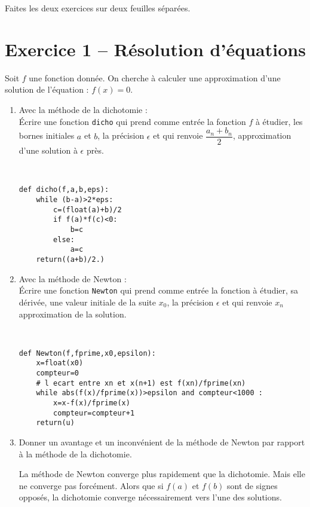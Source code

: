 





\begin{center}
{\Large\bf {\type} \no {\num}}
\end{center}


Faites les deux exercices sur deux feuilles séparées.

\section*{Exercice 1 --  Résolution d'équations}
Soit $f$ une fonction donnée. On cherche à calculer une approximation d'une solution de l'équation : $f(x)=0$.
\begin{enumerate}
\item Avec la méthode de la dichotomie : \\
Écrire une fonction \verb?dicho? qui prend comme entr\' ee la fonction $f$ \` a \' etudier, les bornes initiales $a$ et $b$, la pr\' ecision $\epsilon$ et qui renvoie $\dfrac{a_n+b_n}{2}$, approximation d’une solution \` a $\epsilon$ pr\` es.
\begin{solution}~\\
\vspace{-1cm}
\begin{verbatim}
def dicho(f,a,b,eps):               
    while (b-a)>2*eps:
        c=(float(a)+b)/2
        if f(a)*f(c)<0:
            b=c
        else:
            a=c    
    return((a+b)/2.)
\end{verbatim}    
\end{solution}
\item Avec la méthode de Newton :\\
\' Ecrire une fonction \verb?Newton? qui prend comme entr\' ee la fonction \` a \' etudier, sa d\' eriv\' ee, une valeur initiale de la suite $x_0$, la pr\' ecision $\epsilon$ et qui renvoie $x_n$ approximation de la solution.
\begin{solution}~\\
\vspace{-1cm}
\begin{verbatim}
def Newton(f,fprime,x0,epsilon):
    x=float(x0)
    compteur=0
    # l ecart entre xn et x(n+1) est f(xn)/fprime(xn)
    while abs(f(x)/fprime(x))>epsilon and compteur<1000 : 
        x=x-f(x)/fprime(x)
        compteur=compteur+1
    return(u)        
\end{verbatim}    
\end{solution}
\item Donner un avantage et un inconvénient de la méthode de Newton par rapport à la méthode de la dichotomie.
\begin{solution}
La méthode de Newton converge plus rapidement que la dichotomie. Mais elle ne converge pas forcément. Alors que si $f(a)$ et $f(b)$ sont de signes opposés, la dichotomie converge nécessairement vers l'une des solutions. 
\end{solution}
\end{enumerate}
